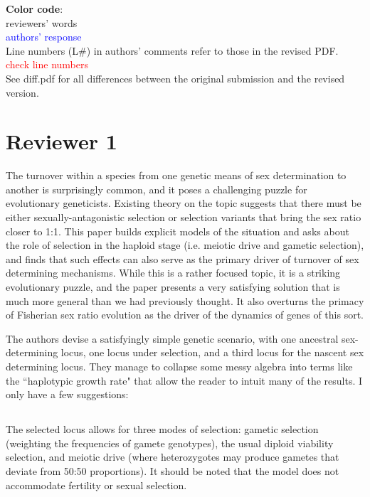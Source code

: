 \documentclass[10pt,letterpaper]{article}
\begin{document}
\noindent\textbf{Color code}:\\
reviewers' words\\
\textcolor{blue}{authors' response}
\\

\noindent  Line numbers (L\#) in authors' comments refer to those in the revised PDF.
\textcolor{red}{check line numbers}
\\

\noindent See diff.pdf for all differences between the original submission and the revised version.

\section{Reviewer 1}

The turnover within a species from one genetic means of sex determination to another is surprisingly common, and it poses a challenging puzzle for evolutionary geneticists.  Existing theory on the topic suggests that there must be either sexually-antagonistic selection or selection variants that bring the sex ratio closer to 1:1.  This paper builds explicit models of the situation and asks about the role of selection in the haploid stage (i.e. meiotic drive and gametic selection), and finds that such effects can also serve as the primary driver of turnover of sex determining mechanisms.  While this is a rather focused topic, it is a striking evolutionary puzzle, and the paper presents a very satisfying solution that is much more general than we had previously thought.  It also overturns the primacy of Fisherian sex ratio evolution as the driver of the dynamics of genes of this sort.

The authors devise a satisfyingly simple genetic scenario, with one ancestral sex-determining locus, one locus under selection, and a third locus for the nascent sex determining locus.  They manage to collapse some messy algebra into terms like the ``haplotypic growth rate" that allow the reader to intuit many of the results.  I only have a few suggestions:

\noindent\subsection{}
The selected locus allows for three modes of selection: gametic selection (weighting the frequencies of gamete genotypes), the usual diploid viability selection, and meiotic drive (where heterozygotes may produce gametes that deviate from 50:50 proportions).  It should be noted that the model does not accommodate fertility or sexual selection.
\end{document}
